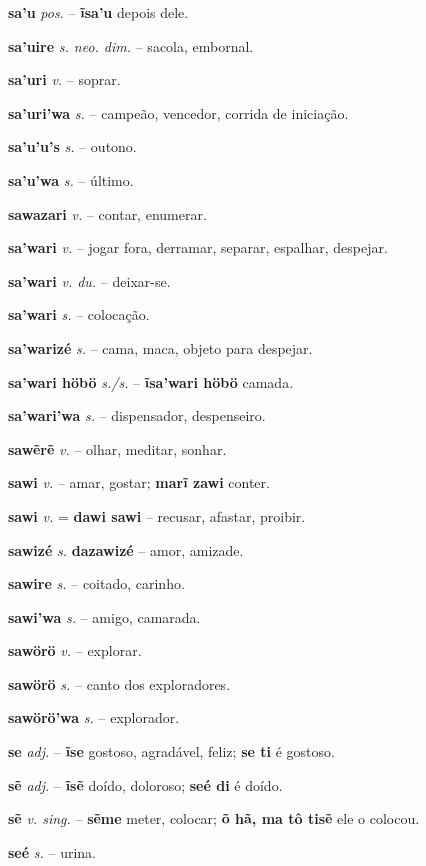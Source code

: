 \textbf{sa'u} \textit{pos.} -- \textbf{ĩsa'u} depois dele.

\textbf{sa'uire} \textit{s. neo. dim.} -- sacola, embornal.

\textbf{sa'uri} \textit{v.} -- soprar.

\textbf{sa'uri'wa} \textit{s.} -- campeão, vencedor, corrida de iniciação.

\textbf{sa'u'u's} \textit{s.} -- outono.

\textbf{sa'u'wa} \textit{s.} -- último.

\textbf{sawazari} \textit{v.} -- contar, enumerar.

\textbf{sa'wari} \textit{v.} -- jogar fora, derramar, separar, espalhar, despejar.

\textbf{sa'wari} \textit{v. du.} -- deixar-se.

\textbf{sa'wari} \textit{s.} -- colocação.

\textbf{sa'warizé} \textit{s.} -- cama, maca, objeto para despejar.

\textbf{sa'wari höbö} \textit{s./s.} -- \textbf{ĩsa'wari höbö} camada.

\textbf{sa'wari'wa} \textit{s.} -- dispensador, despenseiro.

\textbf{sawẽrẽ} \textit{v.} -- olhar, meditar, sonhar.

\textbf{sawi} \textit{v.} -- amar, gostar; \textbf{marĩ zawi} conter.

\textbf{sawi} \textit{v.} = \textbf{dawi sawi} -- recusar, afastar, proibir.

\textbf{sawizé} \textit{s.} \textbf{dazawizé} -- amor, amizade.

\textbf{sawire} \textit{s.} -- coitado, carinho.

\textbf{sawi'wa} \textit{s.} -- amigo, camarada.

\textbf{sawörö} \textit{v.} -- explorar.

\textbf{sawörö} \textit{s.} -- canto dos exploradores.

\textbf{sawörö'wa} \textit{s.} -- explorador.

\textbf{se} \textit{adj.} -- \textbf{ĩse} gostoso, agradável, feliz; \textbf{se ti} é gostoso.

\textbf{sẽ} \textit{adj.} -- \textbf{ĩsẽ} doído, doloroso; \textbf{seé di} é doído.

\textbf{sẽ} \textit{v. sing.} -- \textbf{sẽme} meter, colocar; \textbf{õ hã, ma tô tisẽ} ele o colocou.

\textbf{seé} \textit{s.} -- urina.

